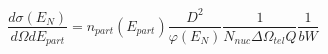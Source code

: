 \documentclass{minimal}
\begin{document}
$$
\frac{d\sigma( E_{N})}{d\Omega dE_{part}} = n_{part}(E_{part})\frac{D^{2}}{\varphi (E_{N})}\frac{1}{N_{nuc}\Delta\Omega_{tel}Q}\frac{1}{bW}
$$
\end{document}
